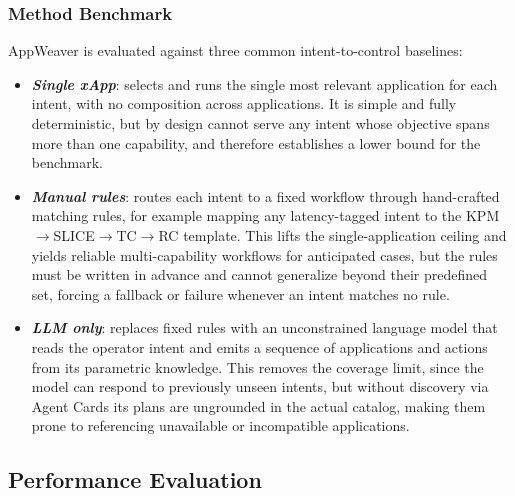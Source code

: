 \documentclass[conference]{IEEEtran}
\begin{document}
\subsubsection{Method Benchmark}
AppWeaver is evaluated against three common intent-to-control baselines:
\begin{itemize}[leftmargin=1.2em, itemsep=2pt, topsep=2pt]
     \item \textbf{\textit{Single xApp}}: selects and runs the single most relevant application for each intent, with no composition across applications. It is simple and fully deterministic, but by design cannot serve any intent whose objective spans more than one capability, and therefore establishes a lower bound for the benchmark.
     \item \textbf{\textit{Manual rules}}: routes each intent to a fixed workflow through hand-crafted matching rules, for example mapping any latency-tagged intent to the KPM$\rightarrow$SLICE$\rightarrow$TC$\rightarrow$RC template. This lifts the single-application ceiling and yields reliable multi-capability workflows for anticipated cases, but the rules must be written in advance and cannot generalize beyond their predefined set, forcing a fallback or failure whenever an intent matches no rule.
    \item \textbf{\textit{LLM only}}: replaces fixed rules with an unconstrained language model that reads the operator intent and emits a sequence of applications and actions from its parametric knowledge. This removes the coverage limit, since the model can respond to previously unseen intents, but without discovery via Agent Cards its plans are ungrounded in the actual catalog, making them prone to referencing unavailable or incompatible applications.
\end{itemize}

\subsection{Performance Evaluation}
\end{document}
